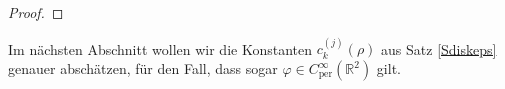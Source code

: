 \documentclass[12pt,a4paper]{scrartcl}
\newcommand{\dd}{\mathrm{d}}
\numberwithin{equation}{section}
\newcommand{\R}{\mathbb{R}} %
\newcommand{\N}{\mathbb{N}} %
\newcommand{\per}{\operatorname{per}}
\newcommand{\fa}{\text{\quad für alle }}
\begin{document}
\begin{proof}

\end{proof}

Im nächsten Abschnitt wollen wir die Konstanten $c_k^{(j)}( \rho)$ aus Satz \ref{Sdiskeps} genauer abschätzen, für den Fall, dass sogar $\varphi \in C_{\per}^\infty(\R^2)$ gilt.
\end{document}
